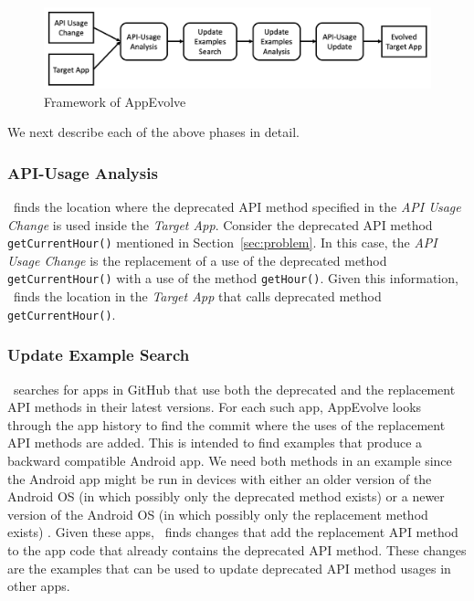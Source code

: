 \begin{figure}[t]
	\centering
	\includegraphics[width=0.8\linewidth]{framework.png}
	\caption{Framework of AppEvolve}
	\label{fig:framework}
\end{figure}

We next describe each of the above phases in detail.
\subsubsection{API-Usage Analysis}
\toolname\ finds the location where the deprecated API method specified in
the {\em API Usage Change} is used inside the {\em Target App}. Consider
the deprecated API method \texttt{getCurrentHour()} mentioned in
Section~\ref{sec:problem}.  In this case, the {\em API Usage Change} is the
replacement of a use of the deprecated method \texttt{getCurrentHour()}
with a use of the method \texttt{getHour()}. Given this information,
\toolname\ finds the location in the {\em Target App} that calls deprecated
method \texttt{getCurrentHour()}.

\subsubsection{Update Example Search}
\toolname\ searches for apps in GitHub that use both the deprecated and the
replacement API methods in their latest versions.  For each such app,
AppEvolve looks through the app history to find the commit where the uses
of the replacement API methods are added. This is intended to find examples
that produce a backward compatible Android app. We need both methods in an
example since the Android app might be run in devices with either an older
version of the Android OS (in which possibly only the deprecated method
exists) or a newer version of the Android OS (in which possibly only the
replacement method exists) . Given these apps, \toolname\ finds changes that add the
replacement API method to the app code that already contains the deprecated
API method. These changes are the examples that can be used to update
deprecated API method usages in other apps.

